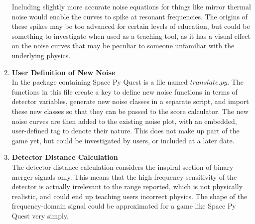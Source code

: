 \documentclass{article}
\begin{document}
\begin{enumerate}
Including slightly more accurate noise equations for things like
mirror thermal noise would enable the curves to spike at resonant
frequencies. The origins of these spikes may be  too advanced for
certain levels of education, but could be something to investigate
when used as a teaching tool, as it has a visual effect on the noise
curves that may be peculiar to someone unfamiliar with the underlying
physics.
        \item \textbf{User Definition of New Noise} \\
    In the package containing Space Py Quest is a file named
    $translate.py$. The functions in this file create a key to define
    new noise functions in terms of detector variables, generate new
    noise classes in a separate script, and import these new classes
    so that they can be passed to the score calculator. The new noise
    curves are then added to the existing noise plot, with an
    embedded, user-defined tag to denote their nature. This does not
    make up part of the game yet, but could be investigated by users,
    or included at a later date.
    \item \textbf{Detector Distance Calculation}\\
    The detector distance calculation considers the inspiral section
    of binary merger signals only. This means that the high-frequency
    sensitivity of the detector is actually irrelevant to the range
    reported, which is not physically realistic, and could end up
    teaching users incorrect physics. The shape of the
    frequency-domain signal could be approximated for a game like
    Space Py Quest very simply. 


\end{enumerate}
\end{document}
